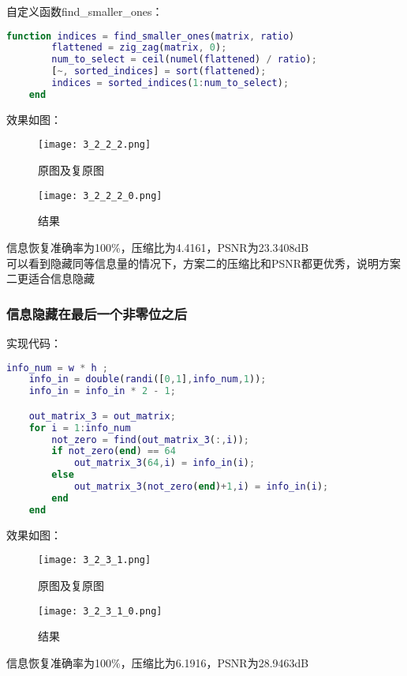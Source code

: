 \documentclass[12pt]{article}
\begin{document}
自定义函数find\_smaller\_ones：
\begin{lstlisting}[language=matlab]
    function indices = find_smaller_ones(matrix, ratio)
        flattened = zig_zag(matrix, 0);
        num_to_select = ceil(numel(flattened) / ratio);
        [~, sorted_indices] = sort(flattened);
        indices = sorted_indices(1:num_to_select);
    end
\end{lstlisting}

效果如图：
\begin{figure}[H]
    \centering
    \texttt{[image: 3\_2\_2\_2.png]}
    \caption{原图及复原图}
\end{figure}

\begin{figure}[H]
    \centering
    \texttt{[image: 3\_2\_2\_2\_0.png]}
    \caption{结果}
\end{figure}

信息恢复准确率为100\%，压缩比为4.4161，PSNR为23.3408dB\\

可以看到隐藏同等信息量的情况下，方案二的压缩比和PSNR都更优秀，说明方案二更适合信息隐藏

\subsubsection{信息隐藏在最后一个非零位之后}

实现代码：
\begin{lstlisting}[language=matlab]
    info_num = w * h ;
    info_in = double(randi([0,1],info_num,1));
    info_in = info_in * 2 - 1;

    out_matrix_3 = out_matrix;
    for i = 1:info_num
        not_zero = find(out_matrix_3(:,i));
        if not_zero(end) == 64
            out_matrix_3(64,i) = info_in(i);
        else
            out_matrix_3(not_zero(end)+1,i) = info_in(i);
        end
    end
\end{lstlisting}

效果如图：
\begin{figure}[H]
    \centering
    \texttt{[image: 3\_2\_3\_1.png]}
    \caption{原图及复原图}
\end{figure}

\begin{figure}[H]
    \centering
    \texttt{[image: 3\_2\_3\_1\_0.png]}
    \caption{结果}
\end{figure}

信息恢复准确率为100\%，压缩比为6.1916，PSNR为28.9463dB\\
\end{document}
